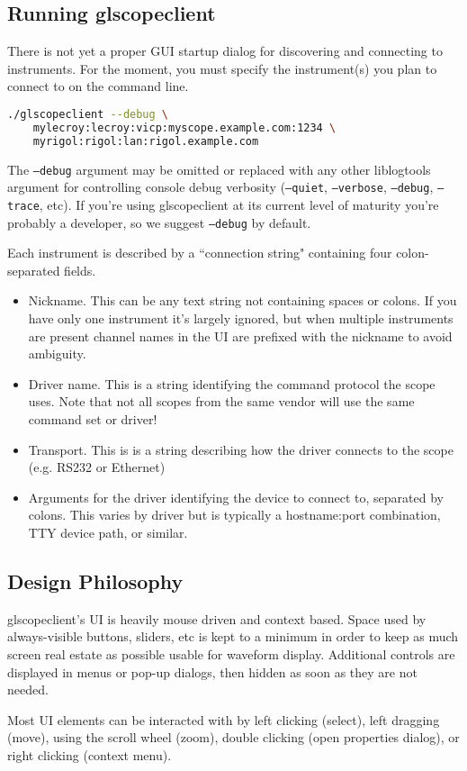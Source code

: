 \subsection{Running glscopeclient}

There is not yet a proper GUI startup dialog for discovering and connecting to instruments. For the moment, you must
specify the instrument(s) you plan to connect to on the command line.

\begin{lstlisting}[language=sh]
./glscopeclient --debug \
	mylecroy:lecroy:vicp:myscope.example.com:1234 \
	myrigol:rigol:lan:rigol.example.com
\end{lstlisting}

The \texttt{--debug} argument may be omitted or replaced with any other liblogtools argument for controlling console
debug verbosity (\texttt{--quiet}, \texttt{--verbose}, \texttt{--debug}, \texttt{--trace}, etc). If you're using
glscopeclient at its current level of maturity you're probably a developer, so we suggest \texttt{--debug} by default.

Each instrument is described by a ``connection string" containing four colon-separated fields.

\begin{itemize}
\item Nickname. This can be any text string not containing spaces or colons. If you have only one instrument it's
largely ignored, but when multiple instruments are present channel names in the UI are prefixed with the nickname to
avoid ambiguity.
\item Driver name. This is a string identifying the command protocol the scope uses. Note that not all
scopes from the same vendor will use the same command set or driver!
\item Transport. This is is a string describing how the driver connects to the scope (e.g. RS232 or Ethernet)
\item Arguments for the driver identifying the device to connect to, separated by colons. This varies by driver but is
typically a hostname:port combination, TTY device path, or similar.
\end{itemize}

\subsection{Design Philosophy}

glscopeclient's UI is heavily mouse driven and context based. Space used by always-visible buttons, sliders, etc is
kept to a minimum in order to keep as much screen real estate as possible usable for waveform display. Additional
controls are displayed in menus or pop-up dialogs, then hidden as soon as they are not needed.

Most UI elements can be interacted with by left clicking (select), left dragging (move), using the scroll wheel (zoom),
double clicking (open properties dialog), or right clicking (context menu).
